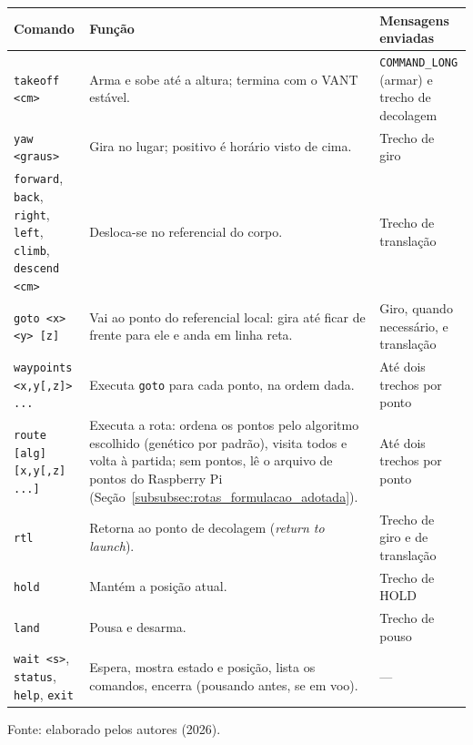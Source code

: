 \begin{quadro}[H]
    \centering
    \caption{Comandos do operador no modo de missão.}
    \label{qua:dronelink_comandos}
    \footnotesize
    \renewcommand{\arraystretch}{1.25}
    \begin{tabular}{|>{\raggedright\arraybackslash}p{3.6cm}|>{\raggedright\arraybackslash}p{6.2cm}|>{\raggedright\arraybackslash}p{4.1cm}|}
        \hline
        \textbf{Comando} & \textbf{Função} & \textbf{Mensagens enviadas} \\
        \hline
        \texttt{takeoff <cm>} & Arma e sobe até a altura; termina com o VANT estável. & \texttt{COMMAND\_LONG} (armar) e trecho de decolagem \\
        \hline
        \texttt{yaw <graus>} & Gira no lugar; positivo é horário visto de cima. & Trecho de giro \\
        \hline
        \texttt{forward}, \texttt{back}, \texttt{right}, \texttt{left}, \texttt{climb}, \texttt{descend} \texttt{<cm>} & Desloca-se no referencial do corpo. & Trecho de translação \\
        \hline
        \texttt{goto <x> <y> [z]} & Vai ao ponto do referencial local: gira até ficar de frente para ele e anda em linha reta. & Giro, quando necessário, e translação \\
        \hline
        \texttt{waypoints <x,y[,z]> ...} & Executa \texttt{goto} para cada ponto, na ordem dada. & Até dois trechos por ponto \\
        \hline
        \texttt{route [alg] [x,y[,z] ...]} & Executa a rota: ordena os pontos pelo algoritmo escolhido (genético por padrão), visita todos e volta à partida; sem pontos, lê o arquivo de pontos do Raspberry Pi (Seção~\ref{subsubsec:rotas_formulacao_adotada}). & Até dois trechos por ponto \\
        \hline
        \texttt{rtl} & Retorna ao ponto de decolagem (\textit{return to launch}). & Trecho de giro e de translação \\
        \hline
        \texttt{hold} & Mantém a posição atual. & Trecho de HOLD \\
        \hline
        \texttt{land} & Pousa e desarma. & Trecho de pouso \\
        \hline
        \texttt{wait <s>}, \texttt{status}, \texttt{help}, \texttt{exit} & Espera, mostra estado e posição, lista os comandos, encerra (pousando antes, se em voo). & --- \\
        \hline
    \end{tabular}
    \par\vspace{0.2cm}
    \footnotesize Fonte: elaborado pelos autores (2026).
\end{quadro}

